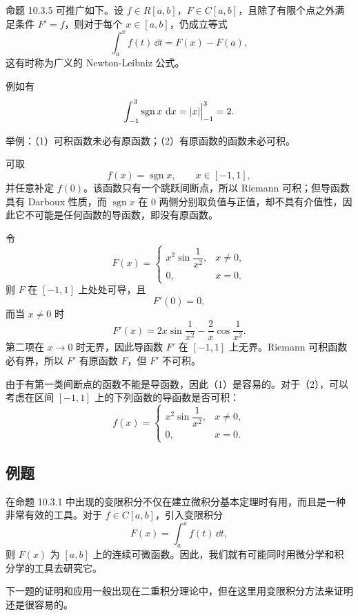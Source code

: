 \begin{xremark}
命题 10.3.5 可推广如下。设 $f\in R[a,b]$，$F\in C[a,b]$，且除了有限个点之外满足条件 $F'=f$，则对于每个 $x\in[a,b]$，仍成立等式
\[
  \int_a^x f(t)\,\dd t=F(x)-F(a),
\]
这有时称为广义的 Newton-Leibniz 公式。

例如有
\[
  \int_{-1}^3\operatorname{sgn}x\,\mathop{}\!\mathrm{d} x=\lvert x\rvert\Big|_{-1}^3=2.
\]
\end{xremark}

\begin{xthought}
举例：（1）可积函数未必有原函数；（2）有原函数的函数未必可积。
\end{xthought}
\begin{xsolution}
可取
\[
  f(x)=\operatorname{sgn}x,\qquad x\in[-1,1],
\]
并任意补定 $f(0)$。该函数只有一个跳跃间断点，所以 Riemann 可积；但导函数具有 Darboux 性质，而 $\operatorname{sgn}x$ 在 $0$ 两侧分别取负值与正值，却不具有介值性，因此它不可能是任何函数的导函数，即没有原函数。

令
\[
  F(x)=
  \begin{cases}
    x^2\sin\dfrac1{x^2},&x\ne0,\\
    0,&x=0.
  \end{cases}
\]
则 $F$ 在 $[-1,1]$ 上处处可导，且
\[
  F'(0)=0,
\]
而当 $x\ne0$ 时
\[
  F'(x)=2x\sin\frac1{x^2}-\frac2x\cos\frac1{x^2}.
\]
第二项在 $x\to0$ 时无界，因此导函数 $F'$ 在 $[-1,1]$ 上无界。Riemann 可积函数必有界，所以 $F'$ 有原函数 $F$，但 $F'$ 不可积。
\end{xsolution}


\begin{xremark}
由于有第一类间断点的函数不能是导函数，因此（1）是容易的。对于（2），可以考虑在区间 $[-1,1]$ 上的下列函数的导函数是否可积：
\[
  f(x)=
  \begin{cases}
    x^2\sin\dfrac1{x^2},&x\ne0,\\
    0,&x=0.
  \end{cases}
\]
\end{xremark}

\subsection{例题}

在命题 10.3.1 中出现的变限积分不仅在建立微积分基本定理时有用，而且是一种非常有效的工具。对于 $f\in C[a,b]$，引入变限积分
\[
  F(x)=\int_a^x f(t)\,\dd t,
\]
则 $F(x)$ 为 $[a,b]$ 上的连续可微函数。因此，我们就有可能同时用微分学和积分学的工具去研究它。

下一题的证明和应用一般出现在二重积分理论中，但在这里用变限积分方法来证明还是很容易的。

